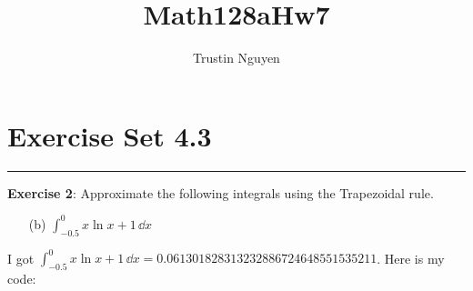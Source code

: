 \documentclass{article}
\title{Math128aHw7}
\author{Trustin Nguyen}
\begin{document}
    \maketitle

\reversemarginpar

\section*{Exercise Set 4.3}
\hrule

\textbf{Exercise 2}: Approximate the following integrals using the Trapezoidal rule.
    \begin{itemize}
        \item [(b)] $\int_{-0.5}^{0} x \ln{x + 1} \, \dd{x}$
    \end{itemize}
    \begin{answer}
        I got $\int_{-0.5}^{0} x \ln{x + 1} \, \dd{x} = 0.061301828313232886724648551535211$. Here is my code:
        \inputminted{matlab}{./code/Integration/Trapezoid.m}
        \inputminted{matlab}{./code/script1.m}
    \end{answer}
\end{document}
